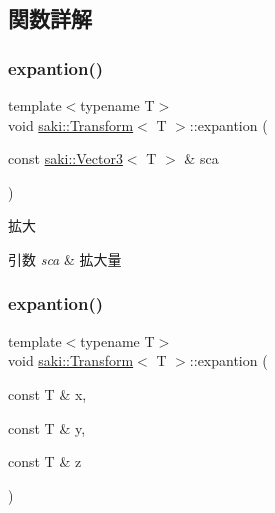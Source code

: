 \subsection{関数詳解}
\mbox{\label{classsaki_1_1_transform_ae5fccba53037829b434269fe2c60b13d}} 
\subsubsection{\texorpdfstring{expantion()}{expantion()}\hspace{0.1cm}{\footnotesize\ttfamily [1/2]}}
{\footnotesize\ttfamily template$<$typename T$>$ \\
void \mbox{\hyperlink{classsaki_1_1_transform}{saki\+::\+Transform}}$<$ T $>$\+::expantion (\begin{DoxyParamCaption}\item[{const \mbox{\hyperlink{classsaki_1_1_vector3}{saki\+::\+Vector3}}$<$ T $>$ \&}]{sca }\end{DoxyParamCaption})\hspace{0.3cm}{\ttfamily [inline]}}



拡大 


\begin{DoxyParams}{引数}
{\em sca} & 拡大量 \\
\hline
\end{DoxyParams}
\mbox{\label{classsaki_1_1_transform_adbb630c8fbb0cc2c03c60ee8f9433a49}} 
\subsubsection{\texorpdfstring{expantion()}{expantion()}\hspace{0.1cm}{\footnotesize\ttfamily [2/2]}}
{\footnotesize\ttfamily template$<$typename T$>$ \\
void \mbox{\hyperlink{classsaki_1_1_transform}{saki\+::\+Transform}}$<$ T $>$\+::expantion (\begin{DoxyParamCaption}\item[{const T \&}]{x,  }\item[{const T \&}]{y,  }\item[{const T \&}]{z }\end{DoxyParamCaption})\hspace{0.3cm}{\ttfamily [inline]}}



